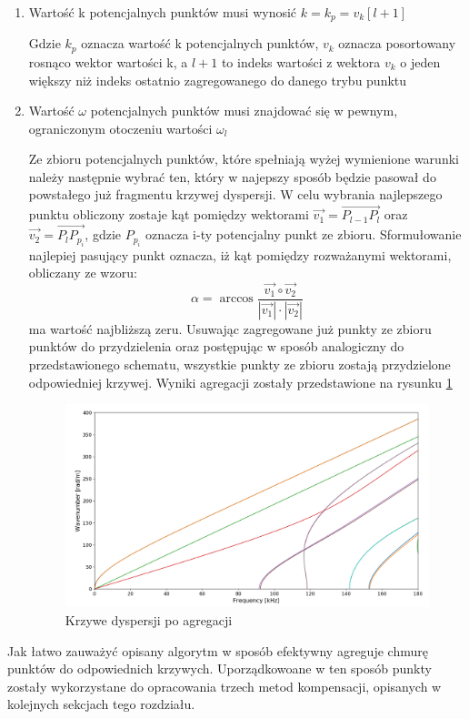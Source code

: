  \begin{enumerate}
 \item Wartość k potencjalnych punktów musi wynosić $k=k_p=v_k[l+1]$
 
 Gdzie $k_p$ oznacza wartość k potencjalnych punktów, $v_k$ oznacza posortowany rosnąco wektor wartości k, a $l+1$ to indeks wartości z wektora $v_k$ o jeden większy niż indeks ostatnio zagregowanego do danego trybu punktu
 \item Wartość $\omega$ potencjalnych punktów musi znajdować się w pewnym, ograniczonym otoczeniu wartości $\omega _l$
 
 Ze zbioru potencjalnych punktów, które spełniają wyżej wymienione warunki należy następnie wybrać ten, który w najepszy sposób będzie pasował do powstałego już fragmentu krzywej dyspersji. W celu wybrania najlepszego punktu obliczony zostaje kąt pomiędzy wektorami $\overrightarrow{v_1} = \overrightarrow{P_{l-1}P_l}$ oraz $\overrightarrow{v_2} = \overrightarrow{P_lP_{p_i}}$, gdzie $P_{p_i}$ oznacza i-ty potencjalny punkt ze zbioru. Sformułowanie najlepiej pasujący punkt oznacza, iż kąt pomiędzy rozważanymi wektorami, obliczany ze wzoru:
 \begin{equation}
 \alpha = \arccos\frac{\overrightarrow{v_1} \circ \overrightarrow{v_2}}{|\overrightarrow{v_1}|\cdot|\overrightarrow{v_2}|}
\end{equation}  
ma wartość najbliższą zeru. Usuwając zagregowane już punkty ze zbioru punktów do przydzielenia oraz postępując w sposób analogiczny do przedstawionego schematu, wszystkie punkty ze zbioru zostają przydzielone odpowiedniej krzywej. Wyniki agregacji zostały przedstawione na rysunku \ref{fig:krzywe_po_agregacji}
 
\begin{figure}[h]
\centering
\includegraphics[width=15cm]{Zdjecia/4/zagregowane_krzywe}
\caption{Krzywe dyspersji po agregacji}
\label{fig:krzywe_po_agregacji}
\end{figure}
\end{enumerate}  

Jak łatwo zauważyć opisany algorytm w sposób efektywny agreguje chmurę punktów do odpowiednich krzywych. Uporządkowoane w ten sposób punkty zostały wykorzystane do opracowania trzech metod kompensacji, opisanych w kolejnych sekcjach tego rozdziału.




